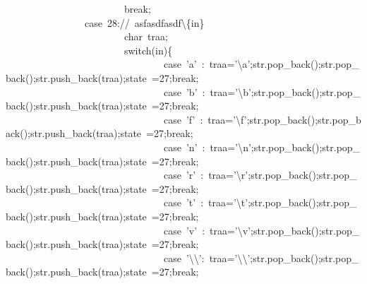\documentclass{article}
\begin{document}
\begin{mdpre}
~~~~~~~~~~~~~~~~~~~~~~~~{break};\\
~~~~~~~~~~~~~~~~{case}~{28}://~asfasdfasdf\textbackslash{}\{in\}\\
~~~~~~~~~~~~~~~~~~~~~~~~{char}~traa;\\
~~~~~~~~~~~~~~~~~~~~~~~~{switch}(in)\{\\
~~~~~~~~~~~~~~~~~~~~~~~~~~~~~~~~{case}~{'a'}~:~traa={'}{\textbackslash{}a}{'};str.pop\_back();str.pop\_back();str.push\_back(traa);state~={27};{break};\\
~~~~~~~~~~~~~~~~~~~~~~~~~~~~~~~~{case}~{'b'}~:~traa={'}{\textbackslash{}b}{'};str.pop\_back();str.pop\_back();str.push\_back(traa);state~={27};{break};\\
~~~~~~~~~~~~~~~~~~~~~~~~~~~~~~~~{case}~{'f'}~:~traa={'}{\textbackslash{}f}{'};str.pop\_back();str.pop\_back();str.push\_back(traa);state~={27};{break};\\
~~~~~~~~~~~~~~~~~~~~~~~~~~~~~~~~{case}~{'n'}~:~traa={'}{\textbackslash{}n}{'};str.pop\_back();str.pop\_back();str.push\_back(traa);state~={27};{break};\\
~~~~~~~~~~~~~~~~~~~~~~~~~~~~~~~~{case}~{'r'}~:~traa={'}{\textbackslash{}r}{'};str.pop\_back();str.pop\_back();str.push\_back(traa);state~={27};{break};\\
~~~~~~~~~~~~~~~~~~~~~~~~~~~~~~~~{case}~{'t'}~:~traa={'}{\textbackslash{}t}{'};str.pop\_back();str.pop\_back();str.push\_back(traa);state~={27};{break};\\
~~~~~~~~~~~~~~~~~~~~~~~~~~~~~~~~{case}~{'v'}~:~traa={'}{\textbackslash{}v}{'};str.pop\_back();str.pop\_back();str.push\_back(traa);state~={27};{break};\\
~~~~~~~~~~~~~~~~~~~~~~~~~~~~~~~~{case}~{'}{\textbackslash{}\textbackslash{}}{'}:~traa={'}{\textbackslash{}\textbackslash{}}{'};str.pop\_back();str.pop\_back();str.push\_back(traa);state~={27};{break};\\

\end{mdpre}
\end{document}
